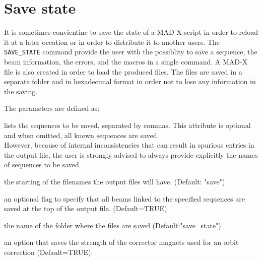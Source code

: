 \chapter{Save state}
\label{chap:savestate}
It is sometimes convientine to save the state of a MAD-X script in order to reload it at a later occation or in order to distribute it to another users.
The \texttt{SAVE\_STATE} command provide the user with the possiblity to save a sequence, the beam information, the errors, and the macros in a single command.
A MAD-X file is also created in order to load the produced files. The files are saved in a separate folder and in hexadecimal format in order not to lose
any information in the saving.


The parameters are defined as:
\begin{madlist}
   lists the sequences to be saved, separated by commas.
  This attribute is optional and when omitted, all known
  sequences are saved. \\
  However, because of internal inconsistencies that can result in spurious
  entries in the output file, the user is strongly advised to always provide
  explicitly the names of sequences to be saved.

   the starting of the filenames the output files will have. (Default: "save")

   an optional flag to specify that all beams linked to the
  specified sequences are saved at the top of the output file. (Default=TRUE)

   the name of the folder where the files are saved (Default:"save\_state")

   an option that saves the strength of the corrector magnets used
  for an orbit correction (Default=TRUE).

\end{madlist}





